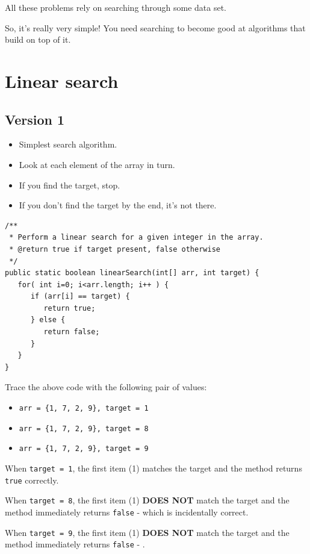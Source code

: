 All these problems rely on searching through some data set.

So, it's really very simple! You need searching to become good at algorithms that build on top of it.

\section{Linear search}

\subsection{Version 1}
\begin{itemize}
  \item Simplest search algorithm.
  \item Look at each element of the array in turn.
  \item If you find the target, stop.
  \item If you don't find the target by the end, it's not there.
\end{itemize}
  
\bug

\begin{lstlisting}
/**
 * Perform a linear search for a given integer in the array.
 * @return true if target present, false otherwise
 */
public static boolean linearSearch(int[] arr, int target) {
   for( int i=0; i<arr.length; i++ ) {
      if (arr[i] == target) {
         return true;
      } else {
         return false;
      }
   }
}
\end{lstlisting}

Trace the above code with the following pair of values:

\begin{itemize}
\item \texttt{arr = \{1, 7, 2, 9\}, target = 1}
\item \texttt{arr = \{1, 7, 2, 9\}, target = 8}
\item \texttt{arr = \{1, 7, 2, 9\}, target = 9}
\end{itemize}

When \texttt{target = 1}, the first item (1) matches the target and the method returns \texttt{true} correctly.

When \texttt{target = 8}, the first item (1) \textbf{DOES NOT} match the target and the method immediately returns \texttt{false} - which is incidentally correct. 

When \texttt{target = 9}, the first item (1) \textbf{DOES NOT} match the target and the method immediately returns \texttt{false} - .

